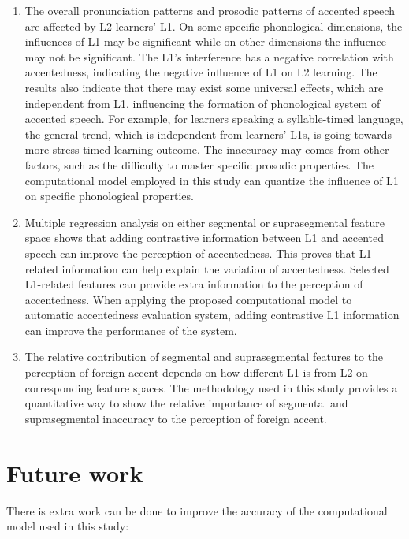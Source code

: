 \begin{enumerate}
\item The overall pronunciation patterns and prosodic patterns of accented speech are affected by L2 learners' L1. On some specific phonological dimensions, the influences of L1 may be significant while on other dimensions the influence may not be significant. The L1's interference has a negative correlation with accentedness, indicating the negative influence of L1 on L2 learning. The results also indicate that there may exist some universal effects, which are independent from L1, influencing the formation of phonological system of accented speech. For example, for learners speaking a syllable-timed language, the general trend, which is independent from learners' L1s, is going towards more stress-timed learning outcome. The inaccuracy may comes from other factors, such as the difficulty to master specific prosodic properties. The computational model employed in this study can quantize the influence of L1 on specific phonological properties.
\item Multiple regression analysis on either segmental or suprasegmental feature space shows that adding contrastive information between L1 and accented speech can improve the perception of accentedness. This proves that L1-related information can help explain the variation of accentedness. Selected L1-related features can provide extra information to the perception of accentedness. When applying the proposed computational model to automatic accentedness evaluation system, adding contrastive L1 information can improve the performance of the system.
\item The relative contribution of segmental and suprasegmental features to the perception of foreign accent depends on how different L1 is from L2 on corresponding feature spaces. The methodology used in this study provides a quantitative way to show the relative importance of segmental and suprasegmental inaccuracy to the perception of foreign accent.
\end{enumerate}


\section{Future work}

There is extra work can be done to improve the accuracy of the computational model used in this study:

